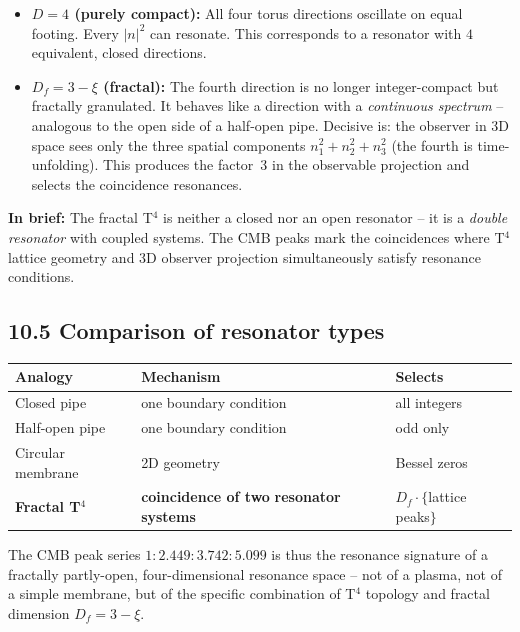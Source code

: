 \begin{itemize}
  \item \textbf{$D = 4$ (purely compact):} All four torus directions
        oscillate on equal footing. Every $|n|^2$ can resonate.
        This corresponds to a resonator with $4$ equivalent,
        closed directions.

  \item \textbf{$D_f = 3 - \xi$ (fractal):} The fourth direction is
        no longer integer-compact but fractally granulated.
        It behaves like a direction with a \emph{continuous
        spectrum} -- analogous to the open side of a half-open pipe.
        Decisive is: the observer in 3D space sees only the three
        spatial components $n_1^2+n_2^2+n_3^2$ (the fourth is
        time-unfolding). This produces the factor~3 in the
        observable projection and selects the
        coincidence resonances.
\end{itemize}

\textbf{In brief:} The fractal T$^4$ is neither a closed nor an
open resonator -- it is a \emph{double resonator} with coupled
systems. The CMB peaks mark the coincidences where
T$^4$ lattice geometry and 3D observer projection simultaneously
satisfy resonance conditions.

\subsection*{10.5 Comparison of resonator types}

\begin{center}
\begin{tabular}{p{3.5cm}p{3.5cm}p{5cm}}
\toprule
\textbf{Analogy} & \textbf{Mechanism} & \textbf{Selects} \\
\midrule
Closed pipe & one boundary condition & all integers \\
Half-open pipe & one boundary condition & odd only \\
Circular membrane & 2D geometry & Bessel zeros \\
\midrule
\textbf{Fractal T$^4$} &
  \textbf{coincidence of two} \newline \textbf{resonator systems} &
  $D_f \cdot \{$lattice peaks$\}$ \\
\bottomrule
\end{tabular}
\end{center}

The CMB peak series $1:2{.}449:3{.}742:5{.}099$ is thus the
resonance signature of a fractally partly-open, four-dimensional
resonance space -- not of a plasma, not of a simple membrane,
but of the specific combination of T$^4$ topology and
fractal dimension $D_f = 3 - \xi$.

